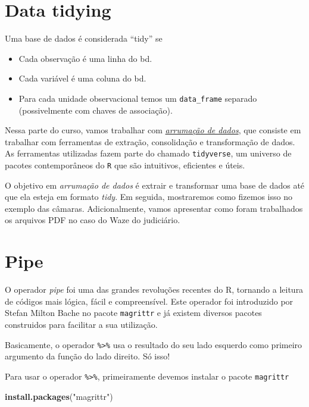 \documentclass[]{book}
\newenvironment{Shaded}{\begin{snugshade}}{\end{snugshade}}
\newcommand{\KeywordTok}[1]{\textcolor[rgb]{0.13,0.29,0.53}{\textbf{{#1}}}}
\newcommand{\StringTok}[1]{\textcolor[rgb]{0.31,0.60,0.02}{{#1}}}
\newcommand{\NormalTok}[1]{{#1}}
\providecommand{\tightlist}{%
  \setlength{\itemsep}{0pt}\setlength{\parskip}{0pt}}
\begin{document}
\section{Data tidying}\label{data-tidying}

Uma base de dados é considerada ``tidy'' se

\begin{itemize}
\tightlist
\item
  Cada observação é uma linha do bd.
\item
  Cada variável é uma coluna do bd.
\item
  Para cada unidade observacional temos um \texttt{data\_frame} separado
  (possivelmente com chaves de associação).
\end{itemize}

Nessa parte do curso, vamos trabalhar com
\href{http://r4ds.had.co.nz/wrangle-intro.html}{\emph{arrumação de
dados}}, que consiste em trabalhar com ferramentas de extração,
consolidação e transformação de dados. As ferramentas utilizadas fazem
parte do chamado \texttt{tidyverse}, um universo de pacotes
contemporâneos do \texttt{R} que são intuitivos, eficientes e úteis.

O objetivo em \emph{arrumação de dados} é extrair e transformar uma base
de dados até que ela esteja em formato \emph{tidy}. Em seguida,
mostraremos como fizemos isso no exemplo das câmaras. Adicionalmente,
vamos apresentar como foram trabalhados os arquivos PDF no caso do Waze
do judiciário.

\section{Pipe}\label{pipe}

O operador \emph{pipe} foi uma das grandes revoluções recentes do R,
tornando a leitura de códigos mais lógica, fácil e compreensível. Este
operador foi introduzido por Stefan Milton Bache no pacote
\texttt{magrittr} e já existem diversos pacotes construidos para
facilitar a sua utilização.

Basicamente, o operador \texttt{\%\textgreater{}\%} usa o resultado do
seu lado esquerdo como primeiro argumento da função do lado direito. Só
isso!

Para usar o operador \texttt{\%\textgreater{}\%}, primeiramente devemos
instalar o pacote \texttt{magrittr}

\begin{Shaded}
\begin{Highlighting}[]
\KeywordTok{install.packages}\NormalTok{(}\StringTok{"magrittr"}\NormalTok{)}
\end{Highlighting}
\end{Shaded}
\end{document}
